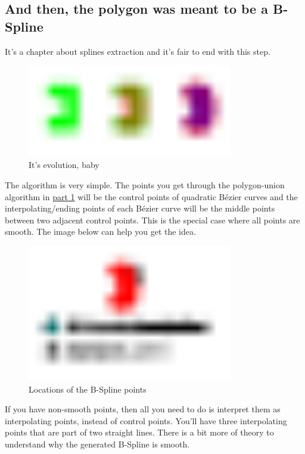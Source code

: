 \subsection{And then, the polygon was meant to be a B-Spline}

It's a chapter about splines extraction and it's fair to end with this step.

\begin{figure}[H]
  \centering
  \includegraphics[width=0.8\textwidth]{assets/evolution.pdf}
  \caption{It's evolution, baby}
\end{figure}

The algorithm is very simple. The points you get through the polygon-union
algorithm in \hyperref[blogpart1]{part 1} will be the control points of
quadratic Bézier curves and the interpolating/ending points of each Bézier curve
will be the middle points between two adjacent control points. This is the
special case where all points are smooth. The image below can help you get the
idea.

\begin{figure}[H]
  \centering
  \includegraphics[width=0.8\textwidth]{assets/points-location.pdf}
  \caption{Locations of the B-Spline points}
\end{figure}

If you have non-smooth points, then all you need to do is interpret them as
interpolating points, instead of control points. You'll have three interpolating
points that are part of two straight lines. There is a bit more of theory to
understand why the generated B-Spline is smooth.
